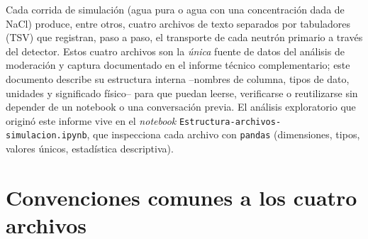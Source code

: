 \documentclass[11pt,a4paper]{article}
\newcommand{\codigo}[1]{\nolinkurl{#1}}
\begin{document}
Cada corrida de simulación (agua pura o agua con una concentración dada de NaCl) produce, entre
otros, cuatro archivos de texto separados por tabuladores (TSV) que registran, paso a paso, el
transporte de cada neutrón primario a través del detector. Estos cuatro archivos son la
\emph{única} fuente de datos del análisis de moderación y captura documentado en el informe
técnico complementario; este documento describe su estructura interna --nombres de columna, tipos
de dato, unidades y significado físico-- para que puedan leerse, verificarse o reutilizarse sin
depender de un notebook o una conversación previa. El análisis exploratorio que originó este
informe vive en el \textit{notebook} \codigo{Estructura-archivos-simulacion.ipynb}, que inspecciona
cada archivo con \codigo{pandas} (dimensiones, tipos, valores únicos, estadística descriptiva).

\section{Convenciones comunes a los cuatro archivos}
\label{sec:convenciones}
\end{document}
